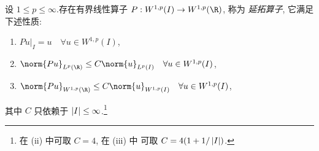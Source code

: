 \begin{theorem}[延拓算子]
\label{thm:8.6}
设 $1\le p\le\infty$.存在有界线性算子 $P:W^{1,p}(I)\to W^{1,p}(\R)$, 称为
\emph{延拓算子}, 它满足下述性质:
\begin{enumerate}[label=(\roman*), leftmargin=2.6em, itemsep=0.2em]
	\item $Pu|_I=u\quad\forall u\in W^{1,p}(I)$,
	\item $\norm{Pu}_{L^p(\R)}\le C\norm{u}_{L^p(I)}\quad\forall u\in W^{1,p}(I)$,
	\item $\norm{Pu}_{W^{1,p}(\R)}\le C\norm{u}_{W^{1,p}(I)}\quad\forall u\in W^{1,p}(I)$,
\end{enumerate}
其中 $C$ 只依赖于 $\left|I\right|\le\infty$.\footnote{在 (ii) 中可取 $C=4$, 在 (iii) 中
可取 $C=4(1+1/\left|I\right|)$.}
\end{theorem}

